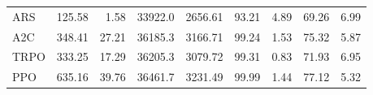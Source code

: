 \begin{samepage}
\begin{center}
\begin{tabular}{l|rr|rr|rr|rr}
    ARS          &   125.58 &     1.58 &    33922.0 &    2656.61 &   93.21 &    4.89 &   69.26 &    6.99 \\
    A2C          &   348.41 &    27.21 &    36185.3 &    3166.71 &   99.24 &    1.53 &   75.32 &    5.87 \\
    TRPO         &   333.25 &    17.29 &    36205.3 &    3079.72 &   99.31 &    0.83 &   71.93 &    6.95 \\
    PPO          &   635.16 &    39.76 &    36461.7 &    3231.49 &   99.99 &    1.44 &   77.12 &    5.32 \\
    \bottomrule
  \end{tabular}
\end{center}
\end{samepage}

